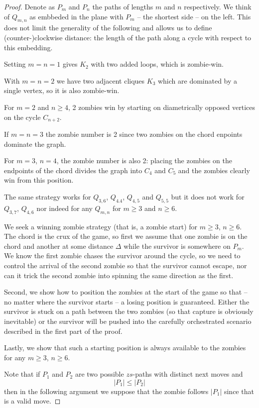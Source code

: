 \begin{proof}
  Denote as $P_m$ and $P_n$ the paths of lengths $m$ and $n$ respectively.
 We think of $Q_{m,n}$ as embbeded in the plane with $P_m$
 -- the shortest side -- on the left.
 This does not limit the generality of the following and allows us to define
 (counter-)clockwise distance: the length of the path
 along a cycle with respect to this embedding.

  Setting $m=n=1$ gives $K_2$ with two added loops, which is zombie-win.

  With $m=n=2$ we have two adjacent cliques $K_3$ which are dominated by a single vertex,
  so it is also zombie-win.

  For $m=2$ and $n\geq 4$, 2 zombies win by starting on diametrically
  opposed vertices on the cycle $C_{n+2}$.

  If $m=n=3$ the zombie number is 2 since two zombies on the chord enpoints dominate the graph.

  For $m=3$, $n=4$, the zombie number is also 2: placing the zombies on the endpoints
  of the chord divides the graph into $C_4$ and $C_5$ and the zombies clearly win from this
  position.

  The same strategy works for $Q_{3,6}$, $Q_{4.4}$, $Q_{4,5}$ and $Q_{5,5}$ but it does
  not work for $Q_{3,7}$, $Q_{4,6}$ nor indeed for any $Q_{m,n}$ for $m \geq 3$ and $n \geq 6$.

  We seek a winning zombie strategy (that is, a zombie start) for $m \geq 3$, $n \geq 6$.
  The chord is the crux of the game, so first we assume that one zombie is on the chord
  and another at some distance $\Delta$ while the survivor is somewhere on $P_m$.
  We know the first zombie chases the survivor around the cycle, so
  we need to control the arrival of the second zombie so that the survivor cannot escape,
  nor can it trick the second zombie into spinning the same direction as the first.

  Second, we show how to position the zombies at the start of the game so that --
  no matter where the survivor starts -- a losing position is guaranteed.
  Either the survivor is stuck on a path between the two zombies (so that capture
  is obviously inevitable) or the survivor will be pushed into the carefully
  orchestrated scenario described in the first part of the proof.

  Lastly, we show that such a starting position is always available to the zombies
  for any $m \geq 3$, $n \geq 6$.

 Note that if $P_1$ and $P_2$ are two possible $zs$-paths with distinct next moves and
 \[ |P_1| \leq |P_2| \]
 then in the following argument we suppose that the zombie follows $|P_1|$
 since that is a valid move.


\end{proof}
